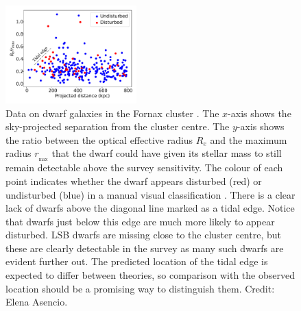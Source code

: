 \documentclass[fleqn,usenatbib,useAMS]{mnras} %
\begin{document}
\begin{figure}
	\centering
	\includegraphics[width=0.45\textwidth]{Fornax_tidal_edge}
	\caption{Data on dwarf galaxies in the Fornax cluster \citep{Venhola_2018}. The $x$-axis shows the sky-projected separation from the cluster centre. The $y$-axis shows the ratio between the optical effective radius $R_e$ and the maximum radius $r_{_{\text{max}}}$ that the dwarf could have given its stellar mass to still remain detectable above the survey sensitivity. The colour of each point indicates whether the dwarf appears disturbed (red) or undisturbed (blue) in a manual visual classification \citep{Venhola_2022}. There is a clear lack of dwarfs above the diagonal line marked as a tidal edge. Notice that dwarfs just below this edge are much more likely to appear disturbed. LSB dwarfs are missing close to the cluster centre, but these are clearly detectable in the survey as many such dwarfs are evident further out. The predicted location of the tidal edge is expected to differ between theories, so comparison with the observed location should be a promising way to distinguish them. Credit: Elena Asencio.}
	\label{Fornax_tidal_edge}
\end{figure}
\end{document}
